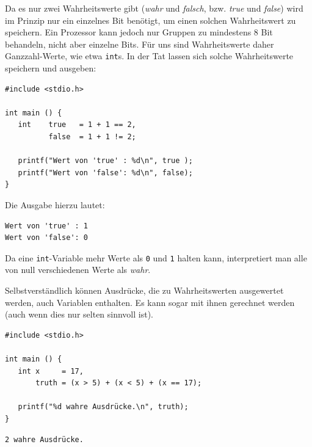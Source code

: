 Da es nur zwei Wahrheitswerte gibt (\emph{wahr} und \emph{falsch}, bzw. \emph{true} und \emph{false}) wird im Prinzip nur ein einzelnes Bit benötigt, um einen solchen Wahrheitswert zu speichern. Ein Prozessor kann jedoch nur Gruppen zu mindestens 8 Bit behandeln, nicht aber einzelne Bits. Für uns sind Wahrheitswerte daher Ganzzahl-Werte, wie etwa \texttt{int}s. In der Tat lassen sich solche Wahrheitswerte speichern und ausgeben:

\begin{codebox}
\begin{verbatim}
#include <stdio.h>

int main () {
   int    true   = 1 + 1 == 2,
          false  = 1 + 1 != 2;

   printf("Wert von 'true' : %d\n", true );
   printf("Wert von 'false': %d\n", false);
}
\end{verbatim}
\end{codebox}

Die Ausgabe hierzu lautet:

\begin{cmdbox}
\begin{verbatim}
Wert von 'true' : 1
Wert von 'false': 0
\end{verbatim}
\end{cmdbox}

Da eine \texttt{int}-Variable mehr Werte als \texttt{0} und \texttt{1} halten kann, interpretiert man alle von null verschiedenen Werte als \emph{wahr}.

Selbstverständlich können Ausdrücke, die zu Wahrheitswerten ausgewertet werden, auch Variablen enthalten. Es kann sogar mit ihnen gerechnet werden (auch wenn dies nur selten sinnvoll ist).

\begin{codebox}
\begin{verbatim}
#include <stdio.h>

int main () {
   int x     = 17,
       truth = (x > 5) + (x < 5) + (x == 17);

   printf("%d wahre Ausdrücke.\n", truth);
}
\end{verbatim}
\end{codebox}

\begin{cmdbox}
\begin{verbatim}
2 wahre Ausdrücke.
\end{verbatim}
\end{cmdbox}

